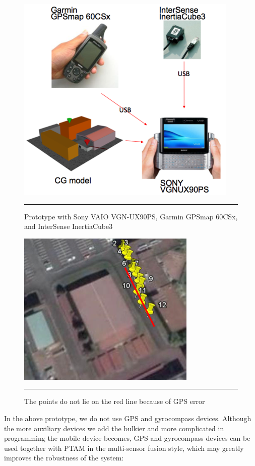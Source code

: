 \begin{figure}[htbp]
	\centering
	\includegraphics{./Primitives/vaio_gps_gyro.png}
	\rule{35em}{0.5pt}
	\caption[Prototype with GPS and gyrocompass devices]{Prototype with Sony VAIO VGN-UX90PS, Garmin GPSmap 60CSx, and InterSense InertiaCube3}
	\label{fig:VAIOGPSGyro}
\end{figure}

\begin{figure}[htbp]
	\centering
	\includegraphics{./Primitives/gps_error.png}
	\rule{35em}{0.5pt}
	\caption[GPS error]{The points do not lie on the red line because of GPS error}
	\label{fig:GPSError}
\end{figure}

In the above prototype, we do not use GPS and gyrocompass devices. Although the more auxiliary devices we add the bulkier and more complicated in programming the mobile device becomes, GPS and gyrocompass devices can be used together with PTAM in the multi-sensor fusion \cite{Reference14} style, which may greatly improves the robustness of the system:

